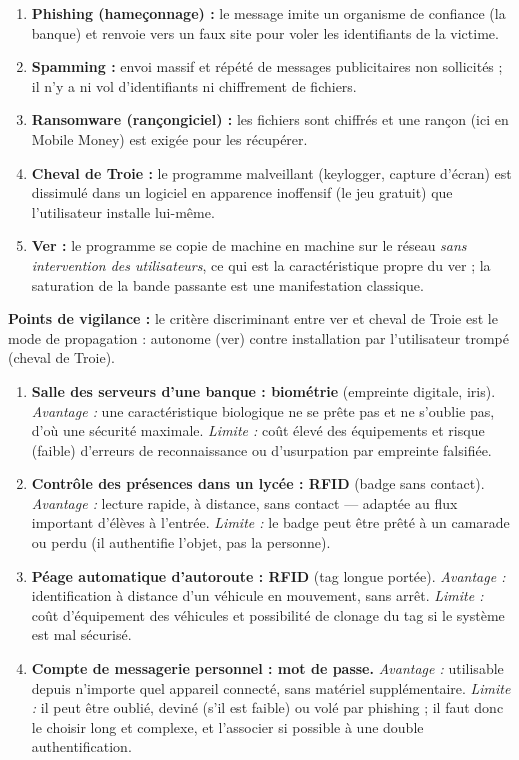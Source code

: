 \documentclass[11pt]{article}
\begin{document}
\begin{corrige}
\begin{enumerate}
\item \textbf{Phishing (hameçonnage) :} le message imite un organisme de confiance (la banque) et renvoie vers un faux site pour voler les identifiants de la victime.
\item \textbf{Spamming :} envoi massif et répété de messages publicitaires non sollicités ; il n'y a ni vol d'identifiants ni chiffrement de fichiers.
\item \textbf{Ransomware (rançongiciel) :} les fichiers sont chiffrés et une rançon (ici en Mobile Money) est exigée pour les récupérer.
\item \textbf{Cheval de Troie :} le programme malveillant (keylogger, capture d'écran) est dissimulé dans un logiciel en apparence inoffensif (le jeu gratuit) que l'utilisateur installe lui-même.
\item \textbf{Ver :} le programme se copie de machine en machine sur le réseau \emph{sans intervention des utilisateurs}, ce qui est la caractéristique propre du ver ; la saturation de la bande passante est une manifestation classique.
\end{enumerate}
\textbf{Points de vigilance :} le critère discriminant entre ver et cheval de Troie est le mode de propagation : autonome (ver) contre installation par l'utilisateur trompé (cheval de Troie).
\end{corrige}

\begin{corrige}
\begin{enumerate}
\item \textbf{Salle des serveurs d'une banque : biométrie} (empreinte digitale, iris). \emph{Avantage :} une caractéristique biologique ne se prête pas et ne s'oublie pas, d'où une sécurité maximale. \emph{Limite :} coût élevé des équipements et risque (faible) d'erreurs de reconnaissance ou d'usurpation par empreinte falsifiée.
\item \textbf{Contrôle des présences dans un lycée : RFID} (badge sans contact). \emph{Avantage :} lecture rapide, à distance, sans contact — adaptée au flux important d'élèves à l'entrée. \emph{Limite :} le badge peut être prêté à un camarade ou perdu (il authentifie l'objet, pas la personne).
\item \textbf{Péage automatique d'autoroute : RFID} (tag longue portée). \emph{Avantage :} identification à distance d'un véhicule en mouvement, sans arrêt. \emph{Limite :} coût d'équipement des véhicules et possibilité de clonage du tag si le système est mal sécurisé.
\item \textbf{Compte de messagerie personnel : mot de passe.} \emph{Avantage :} utilisable depuis n'importe quel appareil connecté, sans matériel supplémentaire. \emph{Limite :} il peut être oublié, deviné (s'il est faible) ou volé par phishing ; il faut donc le choisir long et complexe, et l'associer si possible à une double authentification.
\end{enumerate}
\end{corrige}
\end{document}
